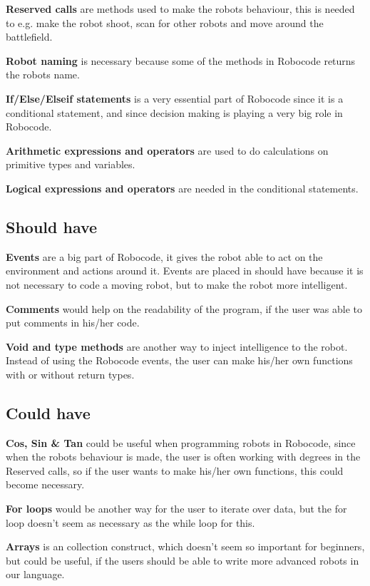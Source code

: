 \textbf{Reserved calls} are methods used to make the robots behaviour, this is needed to e.g. make the robot shoot, scan for other robots and move around the battlefield. 

\textbf{Robot naming} is necessary because some of the methods in Robocode returns the robots name. 

\textbf{If/Else/Elseif statements} is a very essential part of Robocode since it is a conditional statement, and since decision making is playing a very big role in Robocode.

\textbf{Arithmetic expressions and operators} are used to do calculations on primitive types and variables. 

\textbf{Logical expressions and operators} are needed in the conditional statements.

\subsection{Should have}
\textbf{Events} are a big part of Robocode, it gives the robot able to act on the environment and actions around it. Events are placed in should have because it is not necessary to code a moving robot, but to make the robot more intelligent.

\textbf{Comments} would help on the readability of the program, if the user was able to put comments in his/her code. 

\textbf{Void and type methods} are another way to inject intelligence to the robot. Instead of using the Robocode events, the user can make his/her own functions with or without return types. 

\subsection{Could have} 
\textbf{Cos, Sin \& Tan} could be useful when programming robots in Robocode, since when the robots behaviour is made, the user is often working with degrees in the Reserved calls, so if the user wants to make his/her own functions, this could become necessary.

\textbf{For loops} would be another way for the user to iterate over data, but the for loop doesn't seem as necessary as the while loop for this.
 
\textbf{Arrays} is an collection construct, which doesn't seem so important for beginners, but could be useful, if the users should be able to write more advanced robots in our language. 

